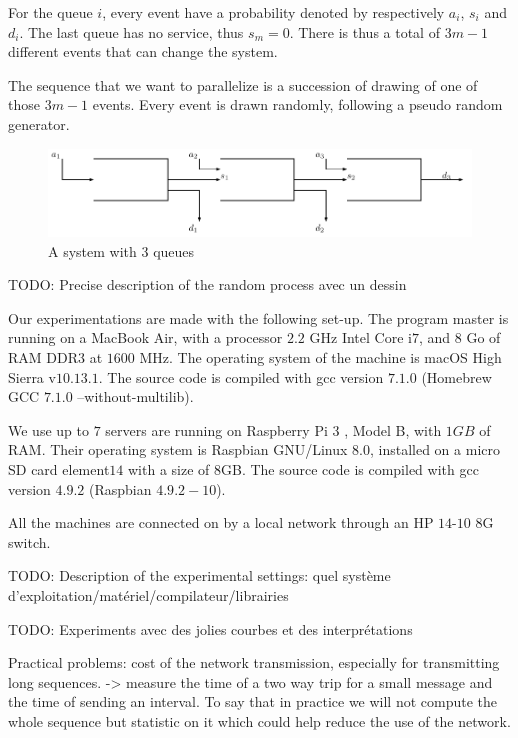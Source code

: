 \documentclass[a4paper,10pt]{article}
\newcommand{\todo}[1]{{\color{red} TODO: {#1}}}
\begin{document}
For the queue $i$, every event have a probability denoted by respectively $a_i$, $s_i$ and $d_i$. The last queue has no service, thus $s_m = 0 $. There is thus a total of $3m-1$ different events that can change the system.

The sequence that we want to parallelize is a succession of drawing of one of those $3m-1$ events. Every event is drawn randomly, following a pseudo random generator.

\begin{figure}
 \includegraphics[scale=0.75]{figures/tandem.pdf}
 \caption{A system with 3 queues}
\end{figure}

\todo{ Precise description of the random process avec un dessin}

Our experimentations are made with the following set-up.
The program master is running on a MacBook Air, with a processor $2.2$ GHz Intel Core i$7$, and $8$ Go of RAM DDR$3$ at $1600$ MHz. The operating system of the machine is macOS High Sierra v$10.13.1$. The source code is compiled with  gcc version $7.1.0$ (Homebrew GCC $7.1.0$ --without-multilib).

We use up to $7$ servers are running on Raspberry Pi 3 , Model B, with $1GB$ of RAM. Their operating system is  Raspbian GNU/Linux $8.0$, installed on a micro SD card element$14$ with a size of $8$GB. The source code is compiled with gcc version $4.9.2$ (Raspbian $4.9.2-10$).

All the machines are connected on by a local network through an HP $14$-$10$ $8$G switch.

\todo{Description of the experimental settings: quel système d'exploitation/matériel/compilateur/librairies}

\todo{Experiments avec des jolies courbes et des interprétations}


Practical problems: cost of the network transmission, especially for transmitting long sequences.
-> measure the time of a two way trip for a small message and the time of sending an interval.
To say that in practice we will not compute the whole sequence but statistic on it which could help
reduce the use of the network.
\end{document}
